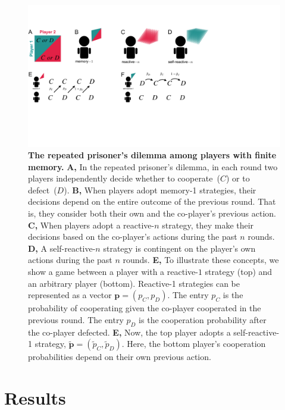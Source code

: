 \documentclass[9pt,twocolumn,twoside]{pnas-new}
\begin{document}
\begin{figure}[h]
       \centering
       \includegraphics[width=.8\textwidth]{../../figures/conceptual_figure.pdf}
       \caption{\textbf{The repeated prisoner's dilemma among players with finite memory.}
       \textbf{A,} In the repeated prisoner's dilemma, in each round two players independently decide whether to cooperate~($C$) or to defect~($D$). 
       \textbf{B,} When players adopt memory-1 strategies, their decisions depend on the entire outcome of the previous round. That is, they consider both their own and the co-player's previous action. 
       \textbf{C,} When players adopt a reactive-$n$ strategy, they make their decisions based on the co-player's actions during the past $n$ rounds. 
       \textbf{D,} A self-reactive-$n$ strategy is contingent on the player's own actions during the past $n$ rounds. 
       \textbf{E,} To illustrate these concepts, we show a game between a player with a reactive-$1$ strategy (top) and an arbitrary player (bottom). 
       Reactive-1 strategies can be represented as a vector  $\mathbf{p} \!=\! (p_C, p_D)$. 
       The entry $p_C$ is the probability of cooperating given the co-player cooperated in the previous round.
       The entry $p_D$ is the cooperation probability after the co-player defected. 
       \textbf{E,} Now, the top player adopts a self-reactive-1 strategy, $\mathbf{\tilde p}\!=\!(\tilde p_C, \tilde p_D)$. 
       Here, the bottom player's cooperation probabilities depend on their own previous action.
       }\label{fig:conceptual_figure_model}
\end{figure}



\section*{Results}

\end{document}
